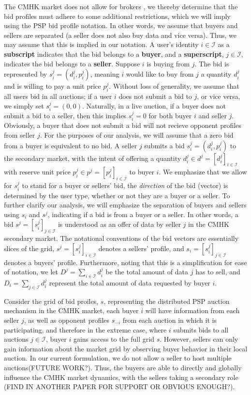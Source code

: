 \documentclass[12pt]{article}
\theoremstyle{definition}
\newcommand{\mcI}{\mathcal{I}}
\begin{document}
\begin{multicols}{2}
The CMHK market does not allow for brokers \cite{cmhk}, we thereby determine that
the bid profiles must adhere to some additional restrictions, which we will
imply using the PSP bid profile notation. In other words, we assume that buyers and sellers are
separated (a seller does not also buy data and vice versa). Thus, we may assume
that this is implied in our notation.
A user's identity $i \in \mcI$ as a \textbf{subscript} indicates that the bid
belongs to a \textbf{buyer}, and a \textbf{superscript}, $j\in\mcI$, indicates
the bid belongs to a \textbf{seller}.
Suppose $i$ is buying from $j$. The bid is represented by $s_i^j = (d_i^j, p_i^j)$, 
meaning $i$ would like to buy from $j$ a quantity $d^j_i$ and is willing to pay
a unit price $p^j_i$. Without loss of generality, we assume that all users bid in all
auctions; if a user $i$ does not submit a bid to $j$, or vice versa, we simply set $s_i^j =
(0,0)$. Naturally, in a live auction, if a buyer does
not submit a bid to a seller, then this implies $s_i^j = 0$ for both buyer $i$
and seller $j$. Obviously, a buyer that does not submit a bid will not recieve opponent profiles from seller
$j$. For the purposes of our analysis, we will assume that a zero bid from a
buyer is equivalent to no bid.
A seller $j$ submits a bid $s_i^j = (d_i^j, p_i^j)$ to the secondary market,
with the intent of offering a
quantity $d_i^j \in d^j = [d_i^j]_{i\in\mcI}$ 
with reserve unit price $p_i^j \in p^j = [p_i^j]_{i\in\mcI}$ to buyer $i$. We emphasize that we allow for $s_i^j$ to
stand for a buyer or sellers' bid, the \emph{direction} of the bid (vector) is determined
by the user type, whether or not they are  a buyer or a seller. 
To further clarify our analysis, we will emphasize the separation of buyers and
sellers using
$s_i$ and $s^j$, indicating if a bid is from a buyer or a seller.
In other words, a bid $s^j =
[s_i^j]_{j\in\mcI}$ is understood as an offer of data by seller $j$ in the CMHK
secondary market. The notational conventions of the bid vectors are essentially 
slices of the grid, $s^j = [s_i^j]_{i\in\mcI}$ denotes a sellers' profile, and $s_i =
[s_i^j]_{j\in\mcI}$ denotes a buyers' profile. 
Furthermore, noting that this is a simplification for ease of notation, we let $D^j = \sum_{i\in\mcI}
d_i^j$ be the total amount of data $j$ has to sell, and $D_i = \sum_{j\in\mcI}
d_i^j$ represent the
total amount of data requested by buyer $i$. 

Consider the grid of bid proiles, $s$, representing the distributed PSP auction
mechanism in the CMHK market, each buyer $i$ will
have information from each seller $j$, as well as opponent profiles $s_{-i}$
from each auction in which it is participating, and therefore
in the extreme case, where $i$ submits bids to all auctions $j\in\mcI$, buyer
$i$ gains access to the full grid $s$. However, 
sellers can only gain information about the market grid by observing buyer
behavior in their local auction.
In our current formulation, we do not allow a seller to host multiple
auctions(FUTURE WORK?). Thus, the buyers are able to directly and globally
influence the CMHK market dynamics, with the sellers taking a secondary role
(FIND IN ANOTHER PAPER FOR SUPPORT OR OBVIOUS ENOUGH?).




\end{multicols}
\end{document}
